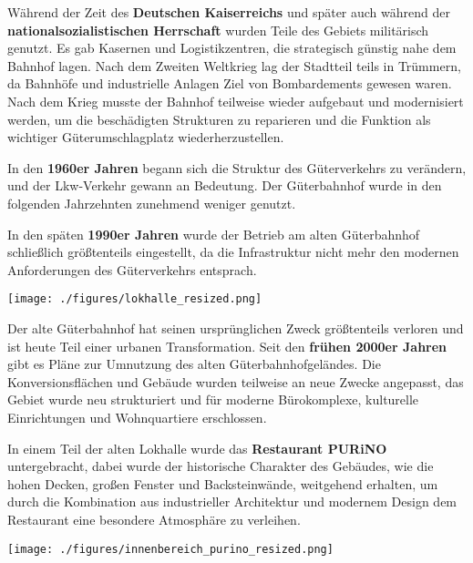 \documentclass[landscape, a4paper]{article}
\newcommand\alert[1]{\textcolor{PrimaryColor}{\textbf{#1}}}
\begin{document}
\begin{minipage}[t]{0.32\textwidth}
	Während der Zeit des \alert{Deutschen Kaiserreichs} und später auch während der \alert{nationalsozialistischen Herrschaft} wurden Teile des Gebiets militärisch genutzt. Es gab Kasernen und Logistikzentren, die strategisch günstig nahe dem Bahnhof lagen. Nach dem Zweiten Weltkrieg lag der Stadtteil teils in Trümmern, da Bahnhöfe und industrielle Anlagen Ziel von Bombardements gewesen waren. Nach dem Krieg musste der Bahnhof teilweise wieder aufgebaut und modernisiert werden, um die beschädigten Strukturen zu reparieren und die Funktion als wichtiger Güterumschlagplatz wiederherzustellen.

In den \alert{1960er Jahren} begann sich die Struktur des Güterverkehrs zu verändern, und der Lkw-Verkehr gewann an Bedeutung. Der Güterbahnhof wurde in den folgenden Jahrzehnten zunehmend weniger genutzt.
\end{minipage}
\hspace{0.4cm}
\begin{minipage}[t]{0.32\textwidth}
	\vspace{0cm}
	\setlength{\parskip}{0.25cm}
	In den späten \alert{1990er Jahren} wurde der Betrieb am alten Güterbahnhof schließlich größtenteils eingestellt, da die Infrastruktur nicht mehr den modernen Anforderungen des Güterverkehrs entsprach.

	\texttt{[image: ./figures/lokhalle\_resized.png]}
	\setlength{\parskip}{0.25cm}

	Der alte Güterbahnhof hat seinen ursprünglichen Zweck größtenteils verloren und ist heute Teil einer urbanen Transformation. Seit den \alert{frühen 2000er Jahren} gibt es Pläne zur Umnutzung des alten Güterbahnhofgeländes. Die Konversionsflächen und Gebäude wurden teilweise an neue Zwecke angepasst, das Gebiet wurde neu strukturiert und für moderne Bürokomplexe, kulturelle Einrichtungen und Wohnquartiere erschlossen. %

  In einem Teil der alten Lokhalle wurde das \alert{Restaurant PURiNO} untergebracht, dabei wurde der historische Charakter des Gebäudes, wie die hohen Decken, großen Fenster und Backsteinwände, weitgehend erhalten, um durch die Kombination aus industrieller Architektur und modernem Design dem Restaurant eine besondere Atmosphäre zu verleihen.

	\texttt{[image: ./figures/innenbereich\_purino\_resized.png]}
	\setlength{\parskip}{0.25cm}

\end{minipage}
\end{document}
